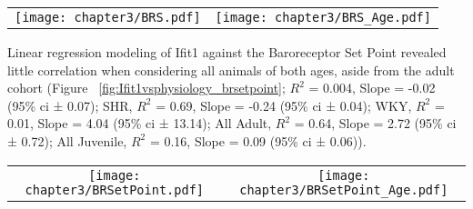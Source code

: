 \begin{figure*}[!htbp]
\centering
\begin{tabular}{cc}
  \texttt{[image: chapter3/BRS.pdf]} & \texttt{[image: chapter3/BRS\_Age.pdf]} \\
\end{tabular}
\caption[Linear Regression Analysis of Physiological \acrshort{brs} against Ifit1 blood expression]{Linear Regression Analysis of Physiological \acrfull{brs}, as ms $mmHg^{-1}$, against Oaz1 normalised Ifit1 blood expression $2^{-\Delta\Delta C_{T}}$ values. For the regression model, displayed here are the slope coefficient of the regression line and the $R^{2}$ correlation coefficient. Also highlighted in grey is the 95\% \acrfull{ci} range for the model. Note the rescaled x-axis for the \acrshort{wky} plot.}
\label{fig:Ifit1vsphysiology_brs}
\end{figure*}

Linear regression modeling of Ifit1 against the Baroreceptor Set Point revealed little correlation when considering all animals of both ages, aside from the adult cohort (Figure ~\ref{fig:Ifit1vsphysiology_brsetpoint}; $R^{2}$ = 0.004, Slope = -0.02 (95\% \acrshort{ci} ± 0.07); SHR, $R^{2}$ = 0.69, Slope = -0.24 (95\% \acrshort{ci} ± 0.04); WKY, $R^{2}$ = 0.01, Slope = 4.04 (95\% \acrshort{ci} ± 13.14); All Adult, $R^{2}$ = 0.64, Slope = 2.72 (95\% \acrshort{ci} ± 0.72); All Juvenile, $R^{2}$ = 0.16, Slope = 0.09 (95\% \acrshort{ci} ± 0.06)). \\

\begin{figure*}[!htbp]
\centering
\begin{tabular}{cc}
  \texttt{[image: chapter3/BRSetPoint.pdf]} & \texttt{[image: chapter3/BRSetPoint\_Age.pdf]} \\
\end{tabular}
\caption[Linear Regression Analysis of Physiological Baroreceptor Set Point against Ifit1 blood expression]{Linear Regression Analysis of Physiological Baroreceptor Set Point, as $mmHg^{-1}$, against Oaz1 normalised Ifit1 blood expression $2^{-\Delta\Delta C_{T}}$ values. For the regression model, displayed here are the slope coefficient of the regression line and the $R^{2}$ correlation coefficient. Also highlighted in grey is the 95\% \acrfull{ci} range for the model. Note the rescaled x-axis for the \acrshort{wky} plot.}
\label{fig:Ifit1vsphysiology_brsetpoint}
\end{figure*}

